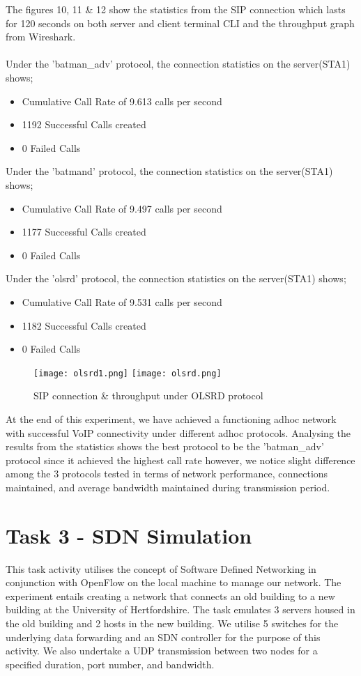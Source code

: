 \documentclass{article}
\begin{document}
\par The figures 10, 11 \& 12 show the statistics from the SIP connection which lasts for 120 seconds on both server and client terminal CLI and the throughput graph from Wireshark. \\\\ Under the 'batman\_adv' protocol, the connection statistics on the server(STA1) shows;
	\begin{itemize}
		\item Cumulative Call Rate of 9.613 calls per second
		\item 1192 Successful Calls created
		\item 0 Failed Calls
	\end{itemize}
Under the 'batmand' protocol, the connection statistics on the server(STA1) shows;
	\begin{itemize}
		\item Cumulative Call Rate of 9.497 calls per second
		\item 1177 Successful Calls created
		\item 0 Failed Calls
	\end{itemize}
Under the 'olsrd' protocol, the connection statistics on the server(STA1) shows;
	\begin{itemize}
		\item Cumulative Call Rate of 9.531 calls per second
		\item 1182 Successful Calls created
		\item 0 Failed Calls
	\end{itemize}
\newpage
    	\begin{figure}[]
        		\centering
        		\texttt{[image: olsrd1.png]}
        		\texttt{[image: olsrd.png]}
        		\caption{SIP connection \& throughput under OLSRD protocol}
        		\label{fig:t2-4}
    	\end{figure}
\par At the end of this experiment, we have achieved a functioning adhoc network with successful VoIP connectivity under different adhoc protocols. Analysing the results from the statistics shows the best protocol to be the 'batman\_adv' protocol since it achieved the highest call rate however, we notice slight difference among the 3 protocols tested in terms of network performance, connections maintained, and average bandwidth maintained during transmission period.

\newpage
\section{Task 3 - SDN Simulation}
This task activity utilises the concept of Software Defined Networking in conjunction with OpenFlow on the local machine to manage our network. The experiment entails creating a network that connects an old building to a new building at the University of Hertfordshire. The task emulates 3 servers housed in the old building and 2 hosts in the new building. We utilise 5 switches for the underlying data forwarding and an SDN controller for the purpose of this activity. We also undertake a UDP transmission  between two nodes for a specified duration, port number, and bandwidth. 
\end{document}
